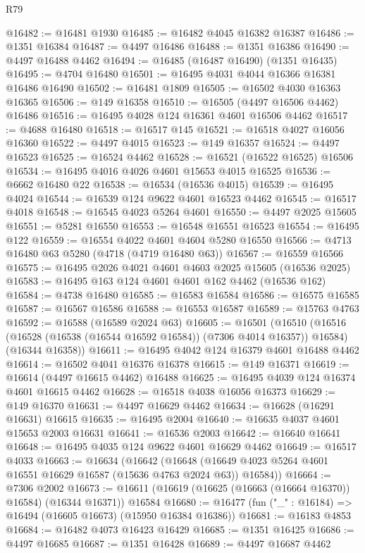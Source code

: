 \begin{lexlean}{R79}
\begin{coremodule}
@16482 := @16481 @1930
@16485 := @16482 @4045 @16382 @16387
@16486 := @1351 @16384
@16487 := @4497 @16486
@16488 := @1351 @16386
@16490 := @4497 @16488 @4462
@16494 := @16485 (@16487 @16490) (@1351 @16435)
@16495 := @4704 @16480
@16501 := @16495 @4031 @4044 @16366 @16381 @16486 @16490
@16502 := @16481 @1809
@16505 := @16502 @4030 @16363 @16365
@16506 := @149 @16358
@16510 := @16505 (@4497 @16506 @4462) @16486
@16516 := @16495 @4028 @124 @16361 @4601 @16506 @4462
@16517 := @4688 @16480
@16518 := @16517 @145
@16521 := @16518 @4027 @16056 @16360
@16522 := @4497 @4015
@16523 := @149 @16357
@16524 := @4497 @16523
@16525 := @16524 @4462
@16528 := @16521 (@16522 @16525) @16506
@16534 := @16495 @4016 @4026 @4601 @15653 @4015 @16525
@16536 := @6662 @16480 @22
@16538 := @16534 (@16536 @4015)
@16539 := @16495 @4024
@16544 := @16539 @124 @9622 @4601 @16523 @4462
@16545 := @16517 @4018
@16548 := @16545 @4023 @5264 @4601
@16550 := @4497 @2025 @15605
@16551 := @5281 @16550
@16553 := @16548 @16551 @16523
@16554 := @16495 @122
@16559 := @16554 @4022 @4601 @4604 @5280 @16550
@16566 := @4713 @16480 @63 @5280 (@4718 (@4719 @16480 @63))
@16567 := @16559 @16566
@16575 := @16495 @2026 @4021 @4601 @4603 @2025 @15605 (@16536 @2025)
@16583 := @16495 @163 @124 @4601 @4601 @162 @4462 (@16536 @162)
@16584 := @4738 @16480
@16585 := @16583 @16584
@16586 := @16575 @16585
@16587 := @16567 @16586
@16588 := @16553 @16587
@16589 := @15763 @4763
@16592 := @16588 (@16589 @2024 @63)
@16605 := @16501
    (@16510
      (@16516 (@16528 (@16538 (@16544 @16592 @16584)) (@7306 @4014 @16357)) @16584)
      (@16344 @16358))
@16611 := @16495 @4042 @124 @16379 @4601 @16488 @4462
@16614 := @16502 @4041 @16376 @16378
@16615 := @149 @16371
@16619 := @16614 (@4497 @16615 @4462) @16488
@16625 := @16495 @4039 @124 @16374 @4601 @16615 @4462
@16628 := @16518 @4038 @16056 @16373
@16629 := @149 @16370
@16631 := @4497 @16629 @4462
@16634 := @16628 (@16291 @16631) @16615
@16635 := @16495 @2004
@16640 := @16635 @4037 @4601 @15653 @2003 @16631
@16641 := @16536 @2003
@16642 := @16640 @16641
@16648 := @16495 @4035 @124 @9622 @4601 @16629 @4462
@16649 := @16517 @4033
@16663 := @16634
    (@16642
      (@16648 (@16649 @4023 @5264 @4601 @16551 @16629 @16587 (@15636 @4763 @2024 @63)) @16584))
@16664 := @7306 @2002
@16673 := @16611 (@16619 (@16625 (@16663 (@16664 @16370)) @16584) (@16344 @16371)) @16584
@16680 := @16477 (fun ("_" : @16184) => @16494 (@16605 @16673) (@15950 @16384 @16386))
@16681 := @16183 @4853
@16684 := @16482 @4073 @16423 @16429
@16685 := @1351 @16425
@16686 := @4497 @16685
@16687 := @1351 @16428
@16689 := @4497 @16687 @4462

\end{coremodule}
\end{lexlean}
